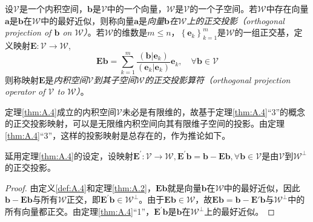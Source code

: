 \documentclass[main.tex]{subfiles}
\begin{document}
\begin{definition}[正交投影]\label{def:A.6}
    设$\mathcal{V}$是一个内积空间，$\mathbf{b}$是$\mathcal{V}$中的一个向量，$\mathcal{W}$是$\mathcal{V}$的一个子空间。若$\mathcal{W}$中存在向量$\mathbf{a}$是$\mathbf{b}$在$\mathcal{W}$中的最好近似，则称向量$\mathbf{a}$是\emph{向量$\mathbf{b}$在$\mathcal{W}$上的正交投影（orthogonal projection of $\mathbf{b}$ on $\mathcal{W}$）}。若$\mathcal{W}$的维数是$m\leq n$，$\left\{\mathbf{e}_k\right\}_{k=1}^m$是$\mathcal{W}$的一组正交基，定义映射$\mathbf{E}:\mathcal{V}\to\mathcal{W}$,
    \[\mathbf{Eb}=\sum_{k=1}^m\frac{\left(\mathbf{b}|\mathbf{e}_k\right)}{\left(\mathbf{e}_k|\mathbf{e}_k\right)}\mathbf{e}_k,\quad\forall\mathbf{b}
        \in\mathcal{V}\]
    则称映射$\mathbf{E}$是\emph{内积空间$\mathcal{V}$到其子空间$\mathcal{W}$的正交投影算符（orthogonal projection operator of $\mathcal{V}$ to $\mathcal{W}$）}。
\end{definition}

定理\ref{thm:A.4}成立的内积空间$\mathcal{V}$未必是有限维的，故基于定理\ref{thm:A.4}“3”的概念的正交投影映射，可以是无限维内积空间向其有限维子空间的投影。由定理\ref{thm:A.4}“3”，这样的投影映射是总存在的，作为推论如下。

\begin{corollary}
    延用定理\ref{thm:A.4}的设定，设映射$\mathbf{E^\prime}:\mathcal{V}\to\mathcal{W},\mathbf{E}^\prime\mathbf{b}=\mathbf{b}-\mathbf{Eb},\forall\mathbf{b}\in\mathcal{V}$是由$\mathcal{V}$到$\mathcal{W}^\perp$的正交投影。
\end{corollary}
\begin{proof}
    由定义\ref{def:A.4}和定理\ref{thm:A.2}，$\mathbf{Eb}$就是向量$\mathbf{b}$在$\mathcal{W}$中的最好近似，因此$\mathbf{b}-\mathbf{Eb}$与所有$\mathcal{W}$正交，即$\mathbf{E}^\prime\mathbf{b}\in\mathcal{W}^\perp$。由于$\mathbf{Eb}\in\mathcal{W}$，故$\mathbf{Eb}=\mathbf{b}-\mathbf{E}\prime\mathbf{b}$与$\mathcal{W}^\perp$中的所有向量都正交。由定理\ref{thm:A.4}“1”，$\mathbf{E}^\prime\mathbf{b}$是$\mathbf{b}$在$\mathcal{W}^\perp$上的最好近似。
\end{proof}
\end{document}
